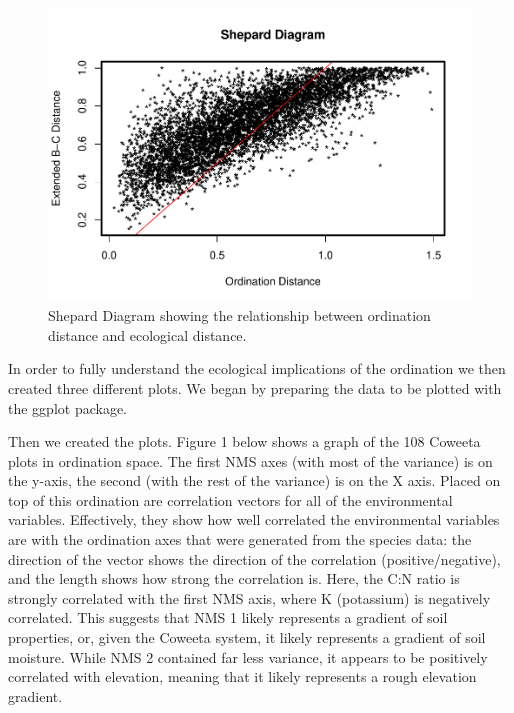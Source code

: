 \documentclass[
  12pt,
]{article}
\begin{document}
\begin{figure}
\centering
\includegraphics{ProjectDraft_files/figure-latex/unnamed-chunk-11-1.pdf}
\caption{Shepard Diagram showing the relationship between ordination
distance and ecological distance.}
\end{figure}

In order to fully understand the ecological implications of the
ordination we then created three different plots. We began by preparing
the data to be plotted with the ggplot package.

Then we created the plots. Figure 1 below shows a graph of the 108
Coweeta plots in ordination space. The first NMS axes (with most of the
variance) is on the y-axis, the second (with the rest of the variance)
is on the X axis. Placed on top of this ordination are correlation
vectors for all of the environmental variables. Effectively, they show
how well correlated the environmental variables are with the ordination
axes that were generated from the species data: the direction of the
vector shows the direction of the correlation (positive/negative), and
the length shows how strong the correlation is. Here, the C:N ratio is
strongly correlated with the first NMS axis, where K (potassium) is
negatively correlated. This suggests that NMS 1 likely represents a
gradient of soil properties, or, given the Coweeta system, it likely
represents a gradient of soil moisture. While NMS 2 contained far less
variance, it appears to be positively correlated with elevation, meaning
that it likely represents a rough elevation gradient.
\end{document}
